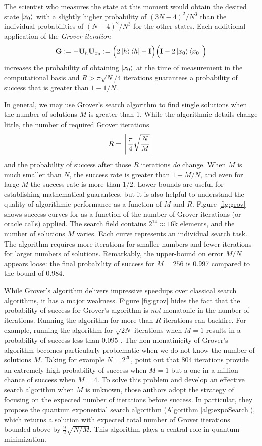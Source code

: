 \documentclass[12pt]{article} %
\DeclarePairedDelimiter{\ceil}{\lceil}{\rceil}
\begin{document}
The scientist who measures the state at this moment would obtain the desired state $\ket{x_0}$ with a slightly higher probability of $(3N-4)^2/N^3$  than the individual probabilities of $(N-4)^2/N^3$ for the other states. Each additional application of the \emph{Grover iteration}
\begin{align*}
\mathbf{G} := - \mathbf{U}_h \mathbf{U}_{x_0} := \Big(2\ket{h}\bra{h}-\mathbf{I} \Big) \Big( \mathbf{I} - 2 \ket{x_0}\bra{x_0} \Big)
\end{align*}
increases the probability of obtaining $\ket{x_0}$ at the time of measurement in the computational basis and $R>\pi\sqrt{N}/4$ iterations guarantees a probability of success that is greater than $1-1/N$.

In general, we may use Grover's search algorithm to find single solutions when the number of solutions $M$ is greater than 1. While the algorithmic details change little, the number of required Grover iterations
\begin{align}\label{eq:R}
R = \ceil[\Bigg]{\frac{\pi}{4} \sqrt{\frac{N}{M}}}
\end{align}
 and the probability of success after those $R$ iterations \emph{do} change.  When $M$ is much smaller than $N$, the success rate is greater than $1-M/N$, and even for large $M$ the success rate is more than $1/2$. Lower-bounds are useful for establishing mathematical guarantees, but it is also helpful to understand the quality of algorithmic performance as a function of $M$ and $R$. Figure \ref{fig:grov} shows success curves for as a function of the number of Grover iterations (or oracle calls) applied.  The search field contains $2^{14} \approx 16$k elements, and the number of solutions $M$ varies. Each curve represents an individual search task.  The algorithm requires more iterations for smaller numbers and fewer iterations for larger numbers of solutions.  Remarkably, the upper-bound on error $M/N$ appears loose: the final probability of success for $M=256$ is 0.997 compared to the bound of 0.984.
 
 While Grover's algorithm delivers impressive speedups over classical search algorithms, it has a major weakness.
 Figure \ref{fig:grov} hides the fact that the probability of success for Grover's algorithm is \emph{not} monatonic in the number of iterations.  Running the algorithm for more than $R$ iterations can backfire.  For example, running the algorithm for $\sqrt{2N}$ iterations when $M=1$ results in a probability of success less than $0.095$ \citep{boyer1998tight}.  The non-monatinicity of Grover's algorithm becomes particularly problematic when we do not know the number of solutions $M$. Taking for example $N=2^{20}$, \citet{boyer1998tight} point out that 804 iterations provide an extremely high probability of success when $M=1$ but a one-in-a-million chance of success when $M=4$.  To solve this problem and develop an effective search algorithm when $M$ is unknown, those authors adopt the strategy of focusing on the expected number of iterations before success. In particular, they propose the quantum exponential search algorithm (Algorithm \ref{alg:expoSearch}), which returns a solution with expected total number of Grover iterations bounded above by $\frac{9}{2}\sqrt{N/M}$.  This algorithm plays a central role in quantum minimization.
 
\end{document}
